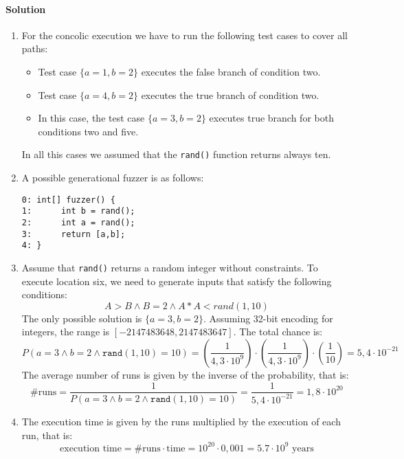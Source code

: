 \paragraph*{Solution}
\begin{enumerate}
    \item For the concolic execution we have to run the following test cases to cover all paths: 
        \begin{itemize}
            \item Test case $\{a = 1, b = 2\}$ executes the false branch of condition two.
            \item Test case $\{a = 4, b = 2\}$ executes the true branch of condition two. 
            \item In this case, the test case $\{a=3, b=2\}$ executes true branch for both conditions two and five. 
        \end{itemize}
        In all this cases we assumed that the \texttt{rand()} function returns always ten. 
    \item A possible generational fuzzer is as follows: 
        \begin{lstlisting}[style=C]
0: int[] fuzzer() {
1:      int b = rand();
2:      int a = rand();
3:      return [a,b]; 
4: }
        \end{lstlisting}
    \item Assume that \texttt{rand()} returns a random integer without constraints. 
        To execute location six, we need to generate inputs that satisfy the following conditions: 
        \[A>B \land B=2 \land A*A<rand(1,10)\]
        The only possible solution is $\{a=3,b=2\}$. 
        Assuming 32-bit encoding for integers, the range is $[-2147483648, 2147483647]$. 
        The total chance is: 
        \[P(a=3 \land b=2 \land \texttt{rand}(1,10)=10)=\left(\dfrac{1}{4,3\cdot 10^9}\right)\cdot\left(\dfrac{1}{4,3\cdot 10^9}\right)\cdot\left(\dfrac{1}{10}\right)=5,4\cdot 10^{-21}\]
        The average number of runs is given by the inverse of the probability, that is: 
        \[\# \text{runs}= \dfrac{1}{P(a=3 \land b=2 \land \texttt{rand}(1,10)=10)}=\dfrac{1}{5,4\cdot 10^{-21}}=1,8 \cdot 10^{20}\]
    \item The execution time is given by the runs multiplied by the execution of each run, that is: 
        \[\text{execution time}=\# \text{runs} \cdot \text{time}= 10^{20} \cdot 0,001 =5.7\cdot 10^{9}  \text{ years}\]
\end{enumerate}







